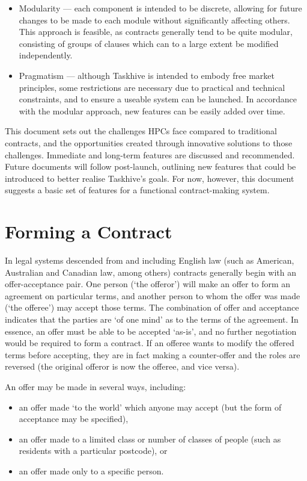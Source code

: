 \documentclass[a4paper,12pt]{article}
\begin{document}
\begin{itemize}
	\item Modularity --- each component is intended to be discrete, allowing for future changes to be made to each module without significantly affecting others. This approach is feasible, as contracts generally tend to be quite modular, consisting of groups of clauses which can to a large extent be modified independently.
	\item Pragmatism --- although Taskhive is intended to embody free market principles, some restrictions are necessary due to practical and technical constraints, and to ensure a useable system can be launched. In accordance with the modular approach, new features can be easily added over time.
\end{itemize}

This document sets out the challenges HPCs face compared to traditional contracts, and the opportunities created through innovative solutions to those challenges. Immediate and long-term features are discussed and recommended. Future documents will follow post-launch, outlining new features that could be introduced to better realise Taskhive's goals. For now, however, this document suggests a basic set of features for a functional contract-making system.

\section{Forming a Contract}

In legal systems descended from and including English law (such as American, Australian and Canadian law, among others) contracts generally begin with an offer-acceptance pair. One person (`the offeror') will make an offer to form an agreement on particular terms, and another person to whom the offer was made (`the offeree') may accept those terms. The combination of offer and acceptance indicates that the parties are `of one mind' as to the terms of the agreement. In essence, an offer must be able to be accepted `as-is', and no further negotiation would be required to form a contract. If an offeree wants to modify the offered terms before accepting, they are in fact making a counter-offer and the roles are reversed (the original offeror is now the offeree, and vice versa).

An offer may be made in several ways, including:

\begin{itemize}
	\item an offer made `to the world' which anyone may accept (but the form of acceptance may be specified),
	\item an offer made to a limited class or number of classes of people (such as residents with a particular postcode), or
	\item an offer made only to a specific person.
\end{itemize}
\end{document}
